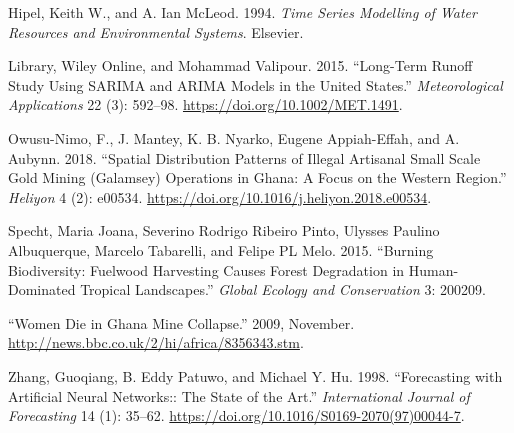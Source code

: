 \documentclass[12pt,a4paper]{book}
\newlength{\cslhangindent}
\newenvironment{CSLReferences}[2] %
 {%
  \setlength{\parindent}{0pt}
  \ifodd #1
  \let\oldpar\par
  \def\par{\hangindent=\cslhangindent\oldpar}
  \fi
  \setlength{\parskip}{}
  \setlength{\baselineskip}{}
 }%
 {}
\begin{document}
{\begin{CSLReferences}{1}{0}
\leavevmode{}%
Hipel, Keith W., and A. Ian McLeod. 1994. \emph{Time Series Modelling of
Water Resources and Environmental Systems}. Elsevier.

\leavevmode{}%
Library, Wiley Online, and Mohammad Valipour. 2015. {``Long-Term Runoff
Study Using SARIMA and ARIMA Models in the United States.''}
\emph{Meteorological Applications} 22 (3): 592--98.
\url{https://doi.org/10.1002/MET.1491}.

\leavevmode{}%
Owusu-Nimo, F., J. Mantey, K. B. Nyarko, Eugene Appiah-Effah, and A.
Aubynn. 2018. {``Spatial Distribution Patterns of Illegal Artisanal
Small Scale Gold Mining (Galamsey) Operations in Ghana: A Focus on the
Western Region.''} \emph{Heliyon} 4 (2): e00534.
\url{https://doi.org/10.1016/j.heliyon.2018.e00534}.

\leavevmode{}%
Specht, Maria Joana, Severino Rodrigo Ribeiro Pinto, Ulysses Paulino
Albuquerque, Marcelo Tabarelli, and Felipe PL Melo. 2015. {``Burning
Biodiversity: Fuelwood Harvesting Causes Forest Degradation in
Human-Dominated Tropical Landscapes.''} \emph{Global Ecology and
Conservation} 3: 200209.

\leavevmode{}%
{``Women Die in Ghana Mine Collapse.''} 2009, November.
\url{http://news.bbc.co.uk/2/hi/africa/8356343.stm}.

\leavevmode{}%
Zhang, Guoqiang, B. Eddy Patuwo, and Michael Y. Hu. 1998. {``Forecasting
with Artificial Neural Networks:: The State of the Art.''}
\emph{International Journal of Forecasting} 14 (1): 35--62.
\url{https://doi.org/10.1016/S0169-2070(97)00044-7}.

\end{CSLReferences}
	
\end{document}
